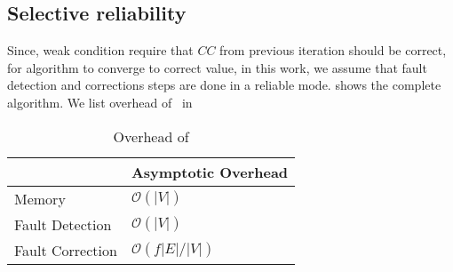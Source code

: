 \subsection{Selective reliability}
Since, weak condition require that $CC$ from previous iteration should be correct, for algorithm
to converge to correct value, in this work, we assume that fault detection and corrections steps 
are done in a reliable mode.   shows the complete algorithm.
We list overhead of~ in 

\begin{table}[htbp]
\centering
\caption{Overhead of \ftsv}
\label{tab:overhead}
\begin{tabular}{l|l}
\toprule 
                 & Asymptotic Overhead     \\
\midrule                  
Memory           & $\mathcal{O}(|V|)$      \\
Fault Detection  & $\mathcal{O}(|V|)$      \\
Fault Correction & $\mathcal{O}(f|E|/|V|)$ \\
\bottomrule 
\end{tabular}
\end{table}